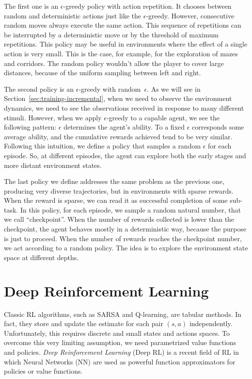 The first one is an $\epsilon$-greedy policy with action repetition. It
chooses between random and deterministic actions just like the
$\epsilon$-greedy. However, consecutive random moves always execute the same
action. This sequence of repetitions can be interrupted by a deterministic
move or by the threshold of maximum repetitions. This policy may be useful in
environments where the effect of a single action is very small. This is the
case, for example, for the exploration of mazes and corridors. The random
policy wouldn't allow the player to cover large distances, because of the
uniform sampling between left and right.

The second policy is an $\epsilon$-greedy with random~$\epsilon$. As we will
see in Section~\ref{sec:training-incremental}, when we need to observe the
environment dynamics, we need to see the observations received in response to
many different stimuli. However, when we apply $\epsilon$-greedy to a capable
agent, we see the following pattern: $\epsilon$ determines the agent's
ability. To a fixed $\epsilon$ corresponds some average ability, and the
cumulative rewards achieved tend to be very similar. Following this intuition,
we define a policy that samples a random $\epsilon$ for each episode.
So, at different episodes, the agent can explore both the early stages and
more distant environment states.

The last policy we define addresses the same problem as the previous one,
producing very diverse trajectories, but in environments with sparse rewards.
When the reward is sparse, we can read it as successful completion of some
sub-task. In this policy, for each episode, we sample a random natural number,
that we call ``checkpoint''. When the number of rewards collected is lower
than the checkpoint, the agent behaves mostly in a deterministic way, because
the purpose is just to proceed. When the number of rewards reaches the
checkpoint number, we act according to a random policy. The idea is to explore
the environment state space at different depths.


\section{Deep Reinforcement Learning}

\label{sec:deep-rl}

Classic RL algorithms, such as SARSA and Q-learning, are tabular methods.
In fact, they store and update the estimate for each pair $(s, a)$
independently. Unfortunately, this requires discrete and small states and
actions spaces. To overcome this very limiting assumption, we need
parametrized value functions and policies.  \emph{Deep Reinforcement Learning}
(Deep RL) is a recent field of RL in which Neural Networks
(NN) are used as powerful function
approximators for policies or value functions.

